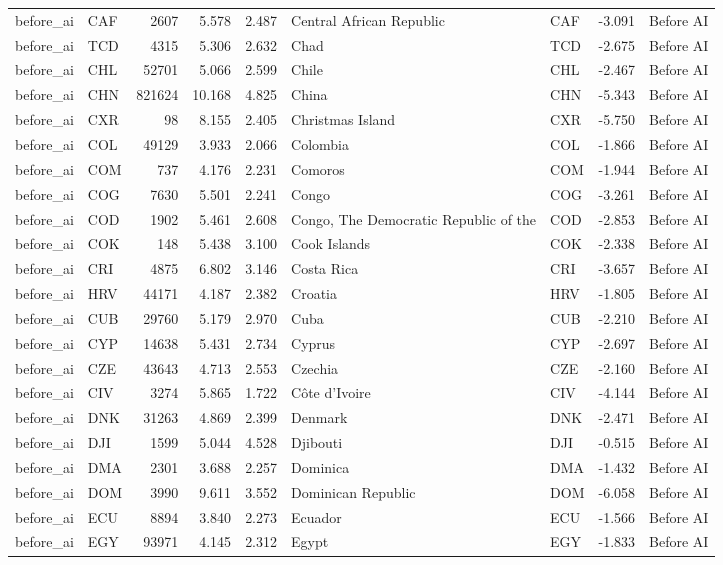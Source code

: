 \begin{tabular}{llrrrllrl}
before\_ai & CAF & 2607 & 5.578 & 2.487 & Central African Republic & CAF & -3.091 & Before AI \\
before\_ai & TCD & 4315 & 5.306 & 2.632 & Chad & TCD & -2.675 & Before AI \\
before\_ai & CHL & 52701 & 5.066 & 2.599 & Chile & CHL & -2.467 & Before AI \\
before\_ai & CHN & 821624 & 10.168 & 4.825 & China & CHN & -5.343 & Before AI \\
before\_ai & CXR & 98 & 8.155 & 2.405 & Christmas Island & CXR & -5.750 & Before AI \\
before\_ai & COL & 49129 & 3.933 & 2.066 & Colombia & COL & -1.866 & Before AI \\
before\_ai & COM & 737 & 4.176 & 2.231 & Comoros & COM & -1.944 & Before AI \\
before\_ai & COG & 7630 & 5.501 & 2.241 & Congo & COG & -3.261 & Before AI \\
before\_ai & COD & 1902 & 5.461 & 2.608 & Congo, The Democratic Republic of the & COD & -2.853 & Before AI \\
before\_ai & COK & 148 & 5.438 & 3.100 & Cook Islands & COK & -2.338 & Before AI \\
before\_ai & CRI & 4875 & 6.802 & 3.146 & Costa Rica & CRI & -3.657 & Before AI \\
before\_ai & HRV & 44171 & 4.187 & 2.382 & Croatia & HRV & -1.805 & Before AI \\
before\_ai & CUB & 29760 & 5.179 & 2.970 & Cuba & CUB & -2.210 & Before AI \\
before\_ai & CYP & 14638 & 5.431 & 2.734 & Cyprus & CYP & -2.697 & Before AI \\
before\_ai & CZE & 43643 & 4.713 & 2.553 & Czechia & CZE & -2.160 & Before AI \\
before\_ai & CIV & 3274 & 5.865 & 1.722 & Côte d'Ivoire & CIV & -4.144 & Before AI \\
before\_ai & DNK & 31263 & 4.869 & 2.399 & Denmark & DNK & -2.471 & Before AI \\
before\_ai & DJI & 1599 & 5.044 & 4.528 & Djibouti & DJI & -0.515 & Before AI \\
before\_ai & DMA & 2301 & 3.688 & 2.257 & Dominica & DMA & -1.432 & Before AI \\
before\_ai & DOM & 3990 & 9.611 & 3.552 & Dominican Republic & DOM & -6.058 & Before AI \\
before\_ai & ECU & 8894 & 3.840 & 2.273 & Ecuador & ECU & -1.566 & Before AI \\
before\_ai & EGY & 93971 & 4.145 & 2.312 & Egypt & EGY & -1.833 & Before AI \\

\end{tabular}
